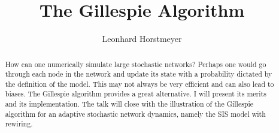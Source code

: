 \documentclass[a4paper,10pt]{article}
\title{The Gillespie Algorithm}
\author{Leonhard Horstmeyer}
\begin{document}
\maketitle

\begin{abstract}
How can one numerically simulate large stochastic networks? Perhaps one would go through each node in the network and update its state with a probability dictated by the definition of the model. This may not always be very efficient and can also lead to biases. The Gillespie algorithm provides a great alternative. I will present its merits and its implementation. The talk will close with the illustration of the Gillespie algorithm for an adaptive stochastic network dynamics, namely the SIS model with rewiring. 
\end{abstract}
\end{document}
